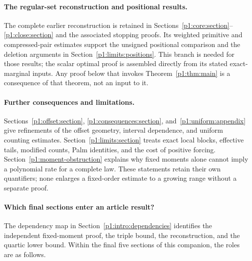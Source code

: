 \paragraph{The regular-set reconstruction and positional results.}
The complete earlier reconstruction is retained in
Sections~\ref{p1:core:section}--\ref{p1:close:section} and
the associated stopping proofs. Its weighted primitive and
compressed-pair estimates support the unsigned positional
comparison and the deletion arguments in
Section~\ref{p1:limits:positions}. This branch is needed for
those results; the scalar optimal proof is assembled directly
from its stated exact-marginal inputs. Any proof below that
invokes Theorem~\ref{p1:thm:main} is a consequence of that
theorem, not an input to it.

\paragraph{Further consequences and limitations.}
Sections~\ref{p1:offset:section}, \ref{p1:consequences:section},
and~\ref{p1:uniform:appendix} give refinements of the offset
geometry, interval dependence, and uniform counting estimates.
Section~\ref{p1:limits:section} treats exact local blocks,
effective tails, modified counts, Palm identities, and the cost
of positive forcing. Section~\ref{p1:moment-obstruction}
explains why fixed moments alone cannot imply a polynomial
rate for a complete law. These statements retain their own
quantifiers; none enlarges a fixed-order estimate to a growing
range without a separate proof.

\paragraph{Which final sections enter an article result?}
The dependency map in Section~\ref{p1:intro:dependencies} identifies
the independent fixed-moment proof, the triple bound, the
reconstruction, and the quartic lower bound. Within the final five
sections of this companion, the roles are as follows.


